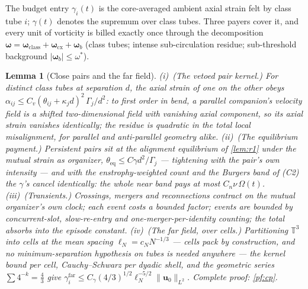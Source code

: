 \documentclass[11pt,letterpaper]{amsart}
\newtheorem{lemma}[theorem]{Lemma}
\theoremstyle{definition}
\theoremstyle{remark}
\newcommand{\TT}{\mathbb{T}}
\newcommand{\om}{\omega}
\newcommand{\vort}{\boldsymbol{\omega}}
\newcommand{\uu}{\boldsymbol{u}}
\newcommand{\norm}[1]{\lVert #1 \rVert}
\newcommand{\abs}[1]{\lvert #1 \rvert}
\begin{document}
The budget entry $\gamma_i(t)$ is the core-averaged ambient axial strain felt by class
tube $i$; $\gamma(t)$ denotes the supremum over class tubes. Three payers cover it,
and every unit of vorticity is billed exactly once through the decomposition
$\vort=\vort_{\mathrm{class}}+\vort_{\mathrm{cx}}+\vort_b$ (class tubes;
intense sub-circulation residue; sub-threshold background $\abs{\vort_b}\le\om^*$).

\begin{lemma}[Close pairs and the far field]\label{lem:cp}
\textup{(i)}~\emph{(The vetoed pair kernel.)} For distinct class tubes at separation
$d$, the axial strain of one on the other obeys
$\alpha_{ij}\le C_v(\theta_{ij}+\kappa_jd)^2\,\Gamma_j/d^2$: to first order in bend, a
parallel companion's velocity field is a shifted two-dimensional field with vanishing
axial component, so its axial strain vanishes \emph{identically}; the residue is
quadratic in the total local misalignment, for parallel and anti-parallel geometry
alike. \textup{(ii)}~\emph{(The equilibrium payment.)} Persistent pairs sit at the
alignment equilibrium of \cref{lem:r1} under the \emph{mutual} strain as organizer,
$\theta_{\mathrm{eq}}\le C\gamma d^2/\Gamma_j$ --- tightening with the pair's own
intensity --- and with the enstrophy-weighted count and the Burgers band of
\textup{(C2)} the $\gamma$'s cancel identically: the whole near band pays at most
$C_n\nu\,\Omega(t)$. \textup{(iii)}~\emph{(Transients.)} Crossings, mergers and
reconnections contract on the mutual organizer's own clock; each event costs a
bounded factor; events are bounded by concurrent-slot, slow-re-entry and
one-merger-per-identity counting; the total absorbs into the episode constant.
\textup{(iv)}~\emph{(The far field, over cells.)} Partitioning $\TT^3$ into cells at
the mean spacing $\ell_N=c_NN^{-1/3}$ --- cells pack by construction, and no
minimum-separation hypothesis on tubes is needed anywhere --- the kernel bound
per cell, Cauchy--Schwarz per dyadic shell, and the geometric series
$\sum4^{-k}=\tfrac43$ give
$\gamma^{\mathrm{far}}_i\le C_\gamma(4/3)^{1/2}\ell_N^{-5/2}\norm{\uu_0}_{L^2}$.
Complete proof: \cref{pf:cp}.
\end{lemma}
\end{document}
